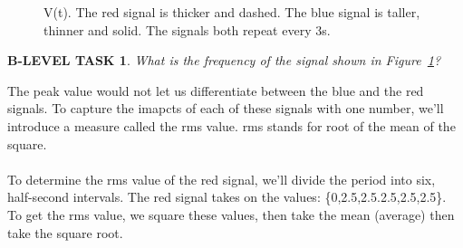 \documentclass{book}
\numberwithin{equation}{section}
\newtheorem{blevel}{B-LEVEL TASK}
\theoremstyle{definition}
\begin{document}
\par
\begin{figure}[H]
\begin{center}
\caption{V(t). The red signal is thicker and dashed. The blue signal is taller, thinner and solid. The signals both repeat every 3s.}
\label{F:8RMS}
\end{center}
\end{figure}

\begin{blevel}
What is the frequency of the signal shown in Figure~\ref{F:8RMS}?
\end{blevel}

The peak value would not let us differentiate between the blue and the red signals. To capture the imapcts of each of these signals with one number, we'll introduce a measure called the rms value. rms stands for root of the mean of the square.\\
\\
To determine the rms value of the red signal, we'll divide the period into six, half-second intervals. The red signal takes on the values: \{0,2.5,2.5.2.5,2.5,2.5\}. To get the rms value, we square these values, then take the mean (average) then take the square root. \\
\end{document}
